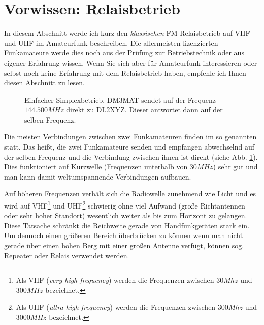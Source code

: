 \section{Vorwissen: Relaisbetrieb} \label{sec:vorwissen} 
In diesem Abschnitt werde ich kurz den \emph{klassischen} FM-Relaisbetrieb auf VHF und UHF im Amateurfunk beschreiben. Die allermeisten lizenzierten Funkamateure werde dies noch aus der Prüfung zur Betriebstechnik oder aus eigener Erfahrung wissen. Wenn Sie sich aber für Amateurfunk interessieren oder selbst noch keine Erfahrung mit dem Relaisbetrieb haben, empfehle ich Ihnen diesen Abschnitt zu lesen. 

\begin{figure}[!ht]
 \centering
 \caption{Einfacher Simplexbetrieb, DM3MAT sendet auf der Frequenz $144.500 MHz$ direkt zu DL2XYZ. Dieser antwortet dann auf der selben Frequenz.} \label{fig:basicsimlpex}
\end{figure}

Die meisten Verbindungen zwischen zwei Funkamateuren finden im so genannten  statt. Das heißt, die zwei Funkamateure senden und empfangen abwechselnd auf der selben Frequenz und die Verbindung zwischen ihnen ist direkt (siehe Abb. \ref{fig:basicsimlpex}). Dies funktioniert auf Kurzwelle (Frequenzen unterhalb von $30MHz$) sehr gut und man kann damit weltumspannende Verbindungen aufbauen. 

Auf höheren Frequenzen verhält sich die Radiowelle zunehmend wie Licht und es wird auf VHF\footnote{Als VHF (\emph{very high frequency}) werden die Frequenzen zwischen $30Mhz$ und $300MHz$ bezeichnet.} und UHF\footnote{Als UHF (\emph{ultra high frequency}) werden die Frequenzen zwischen $300Mhz$ und $3000MHz$ bezeichnet.} schwierig ohne viel Aufwand (große Richtantennen oder sehr hoher Standort) wesentlich weiter als bis zum Horizont zu gelangen. Diese Tatsache schränkt die Reichweite gerade von Handfunkgeräten stark ein. Um dennoch einen größeren Bereich überbrücken zu können wenn man nicht gerade über einen hohen Berg mit einer großen Antenne verfügt, können sog. Repeater oder Relais verwendet werden. 

